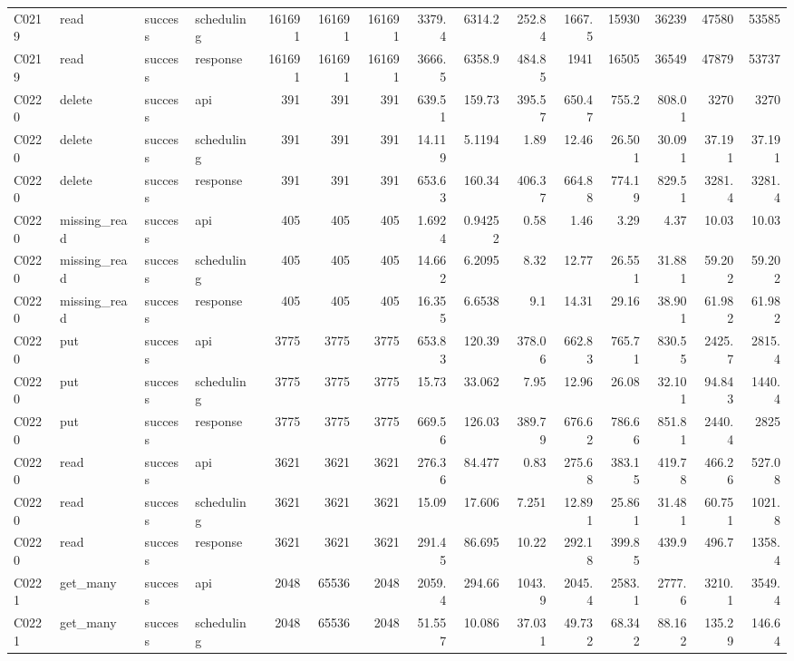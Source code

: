 \begin{landscape}
\begin{longtable}{llllrrrrrrrrrrr}
C0219 & read & success & scheduling & 161691 & 161691 & 161691 & 3379.4 & 6314.2 & 252.84 & 1667.5 & 15930 & 36239 & 47580 & 53585\\
C0219 & read & success & response & 161691 & 161691 & 161691 & 3666.5 & 6358.9 & 484.85 & 1941 & 16505 & 36549 & 47879 & 53737\\
C0220 & delete & success & api & 391 & 391 & 391 & 639.51 & 159.73 & 395.57 & 650.47 & 755.2 & 808.01 & 3270 & 3270\\
C0220 & delete & success & scheduling & 391 & 391 & 391 & 14.119 & 5.1194 & 1.89 & 12.46 & 26.501 & 30.091 & 37.191 & 37.191\\
C0220 & delete & success & response & 391 & 391 & 391 & 653.63 & 160.34 & 406.37 & 664.88 & 774.19 & 829.51 & 3281.4 & 3281.4\\
C0220 & missing\_\allowbreak{}read & success & api & 405 & 405 & 405 & 1.6924 & 0.94252 & 0.58 & 1.46 & 3.29 & 4.37 & 10.03 & 10.03\\
C0220 & missing\_\allowbreak{}read & success & scheduling & 405 & 405 & 405 & 14.662 & 6.2095 & 8.32 & 12.77 & 26.551 & 31.881 & 59.202 & 59.202\\
C0220 & missing\_\allowbreak{}read & success & response & 405 & 405 & 405 & 16.355 & 6.6538 & 9.1 & 14.31 & 29.16 & 38.901 & 61.982 & 61.982\\
C0220 & put & success & api & 3775 & 3775 & 3775 & 653.83 & 120.39 & 378.06 & 662.83 & 765.71 & 830.55 & 2425.7 & 2815.4\\
C0220 & put & success & scheduling & 3775 & 3775 & 3775 & 15.73 & 33.062 & 7.95 & 12.96 & 26.08 & 32.101 & 94.843 & 1440.4\\
C0220 & put & success & response & 3775 & 3775 & 3775 & 669.56 & 126.03 & 389.79 & 676.62 & 786.66 & 851.81 & 2440.4 & 2825\\
C0220 & read & success & api & 3621 & 3621 & 3621 & 276.36 & 84.477 & 0.83 & 275.68 & 383.15 & 419.78 & 466.26 & 527.08\\
C0220 & read & success & scheduling & 3621 & 3621 & 3621 & 15.09 & 17.606 & 7.251 & 12.891 & 25.861 & 31.481 & 60.751 & 1021.8\\
C0220 & read & success & response & 3621 & 3621 & 3621 & 291.45 & 86.695 & 10.22 & 292.18 & 399.85 & 439.9 & 496.7 & 1358.4\\
C0221 & get\_\allowbreak{}many & success & api & 2048 & 65536 & 2048 & 2059.4 & 294.66 & 1043.9 & 2045.4 & 2583.1 & 2777.6 & 3210.1 & 3549.4\\
C0221 & get\_\allowbreak{}many & success & scheduling & 2048 & 65536 & 2048 & 51.557 & 10.086 & 37.031 & 49.732 & 68.342 & 88.162 & 135.29 & 146.64\\

\end{longtable}
\end{landscape}

